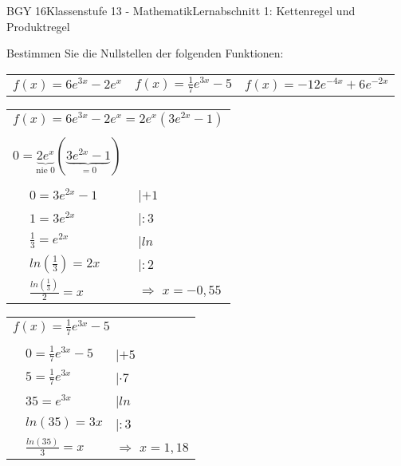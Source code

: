 \documentclass[oneside,openany,headings=optiontotoc,11pt,numbers=noenddot]{scrreprt}
\begin{document}
	\begin{worksheet}{BGY 16}{Klassenstufe 13 - Mathematik}{Lernabschnitt 1: Kettenregel und Produktregel}
				
		\noindent
		\sffamily
		\begin{framed}
			\noindent
			Bestimmen Sie die Nullstellen der folgenden Funktionen:\\
			\par\noindent
			\begin{tabularx}{\textwidth}{|M|M|M|}
				\(f(x) = 6e^{3x}-2e^x\) & \(f(x) = \frac{1}{7}e^{3x}-5\) & \(f(x) = -12e^{-4x}+6e^{-2x}\)
			\end{tabularx}
		\end{framed}
	\begin{framed}
		\noindent
		\begin{tabularx}{\textwidth}{lll}
			\multicolumn{3}{l}{\(f(x) = 6e^{3x}-2e^x = 2e^x(3e^{2x}-1)\)}\\
			\\
			\multicolumn{2}{l}{\(0 = \underbrace{2e^x}_{\text{nie 0}}(\underbrace{3e^{2x}-1}_{=0})\)}\\
			\\
			& \(0 = 3e^{2x}-1\) & |\(+1\)\\
			& \(1 = 3e^{2x}\) & |\(:3\)\\
			& \(\frac{1}{3} = e^{2x}\) & |\(ln\)\\
			& \(ln(\frac{1}{3}) = 2x\) & |\(:2\)\\
			& \(\frac{ln(\frac{1}{3})}{2} = x\) & \(\Rightarrow\) \colorbox{green!10}{\(x = -0,55\)}
		\end{tabularx}
	\end{framed}
	\begin{framed}
		\noindent
		\begin{tabularx}{\textwidth}{lll}
			\multicolumn{3}{l}{\(f(x) = \frac{1}{7}e^{3x}-5\)}\\
			\\
			& \(0 = \frac{1}{7}e^{3x}-5\) & |\(+5\)\\
			& \(5 = \frac{1}{7}e^{3x}\) & |\(\cdot{}7\)\\
			& \(35 = e^{3x}\) & |\(ln\)\\
			& \(ln(35) = 3x\) & |\(:3\)\\
			& \(\frac{ln(35)}{3} = x\) & \(\Rightarrow\) \colorbox{green!10}{\(x = 1,18\)}
		\end{tabularx}
	\end{framed}
	\begin{framed}
		\noindent
		\begin{tabularx}{\textwidth}{lll}

\end{tabularx}
\end{framed}
\end{worksheet}
\end{document}
